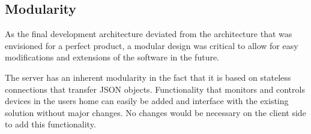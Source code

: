 \subsection{Modularity}
\label{sec:modularity}
As the final development architecture deviated from the architecture that was envisioned for a perfect product, a modular design was critical to allow for easy modifications and 
extensions of the software in the future. 

The server has an inherent modularity in the fact that it is based on stateless connections that transfer JSON objects. Functionality that monitors and controls devices in the users home can easily be added and interface with the existing solution without major changes. No changes would be necessary on the client side to add this functionality.
